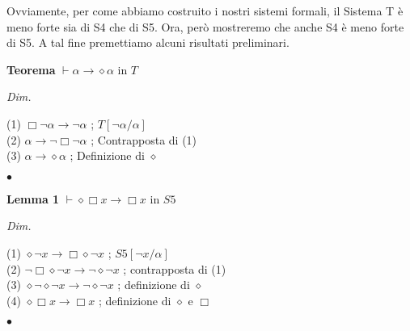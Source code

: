 \documentclass[a4paper, 12pt]{article}
\begin{document}
Ovviamente, per come abbiamo costruito i nostri sistemi formali, il Sistema T è meno forte
sia di S4 che di S5.
Ora, però mostreremo che anche S4 è meno forte di S5. A tal fine premettiamo alcuni risultati
preliminari.

\begin{flushleft}
\textbf{Teorema}
$\vdash \alpha \rightarrow \diamond \alpha$ in $T$

\textit{Dim.}

(1) $\Box \neg \alpha \rightarrow \neg \alpha$ ; $T[\neg \alpha/\alpha]$ \\
(2) $\alpha \rightarrow \neg \Box \neg \alpha$ ; Contrapposta di (1) \\
(3) $\alpha \rightarrow \diamond \alpha$ ; Definizione di $\diamond$

\begin{flushright}
$\bullet$
\end{flushright}
\end{flushleft}

\begin{flushleft}
\textbf{Lemma 1}
$\vdash \diamond \Box x \rightarrow \Box x$ in $S5$

\textit{Dim.}

(1) $\diamond \neg x \rightarrow \Box \diamond \neg x$ ; $S5[\neg x/\alpha]$ \\
(2) $\neg \Box \diamond \neg x \rightarrow \neg \diamond \neg x$ ; contrapposta di (1) \\
(3) $\diamond \neg \diamond \neg x \rightarrow \neg \diamond \neg x$ ; definizione di $\diamond$ \\
(4) $\diamond \Box x \rightarrow \Box x$ ; definizione di $\diamond$ e $\Box$

\begin{flushright}
$\bullet$
\end{flushright}
\end{flushleft}
\end{document}
